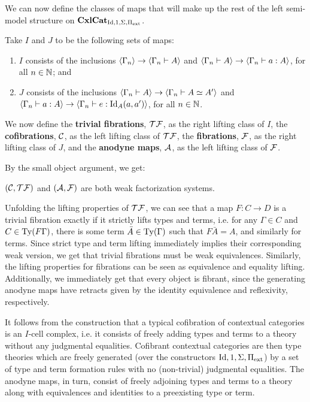 \documentclass{amsart}
\begin{document}
We can now define the classes of maps that will make up the rest of the left semi-model structure on $\operatorname{\mathbf{CxlCat}}_{\operatorname{Id},1,\Sigma,\Pi_{\operatorname{ext}}}$.
\begin{defn}
    Take $I$ and $J$ to be the following sets of maps:
    \begin{enumerate}
        \item $I$ consists of the inclusions $\langle\Gamma_n\rangle\to\langle\Gamma_n\vdash A\rangle$ and $\langle\Gamma_n\vdash A\rangle\to\langle\Gamma_n\vdash a:A\rangle$, for all $n\in\mathbb{N}$; and
        \item $J$ consists of the inclusions $\langle\Gamma_n\vdash A\rangle\to\langle\Gamma_n\vdash A\simeq A'\rangle$ and $\langle\Gamma_n\vdash a:A\rangle\to\langle\Gamma_n\vdash e:\operatorname{Id}_A(a,a')\rangle$, for all $n\in\mathbb{N}$.
    \end{enumerate}
\end{defn}
\begin{defn}
    We now define the \textbf{trivial fibrations}, $\mathcal{T}\mathcal{F}$, as the right lifting class of $I$, the \textbf{cofibrations}, $\mathcal{C}$, as the left lifting class of $\mathcal{T}\mathcal{F}$, the \textbf{fibrations}, $\mathcal{F}$, as the right lifting class of $J$, and the \textbf{anodyne maps}, $\mathcal{A}$, as the left lifting class of $\mathcal{F}$.
\end{defn}

By the small object argument, we get:
\begin{prop}
    $(\mathcal{C},\mathcal{T}\mathcal{F})$ and $(\mathcal{A},\mathcal{F})$ are both weak factorization systems.
\end{prop}

Unfolding the lifting properties of $\mathcal{T}\mathcal{F}$, we can see that a map $F\colon C\to D$ is a trivial fibration exactly if it strictly lifts types and terms, i.e. for any $\Gamma\in C$ and $C\in\operatorname{Ty}(F\Gamma)$, there is some term $\bar{A}\in\operatorname{Ty}(\Gamma)$ such that $F\bar{A}=A$, and similarly for terms. Since strict type and term lifting immediately implies their corresponding weak version, we get that trivial fibrations must be weak equivalences. Similarly, the lifting properties for fibrations can be seen as equivalence and equality lifting. Additionally, we immediately get that every object is fibrant, since the generating anodyne maps have retracts given by the identity equivalence and reflexivity, respectively.

It follows from the construction that a typical cofibration of contextual categories is an $I$-cell complex, i.e. it consists of freely adding types and terms to a theory without any judgmental equalities. Cofibrant contextual categories are then type theories which are freely generated (over the constructors $\operatorname{Id},1,\Sigma,\Pi_{\operatorname{ext}}$) by a set of type and term formation rules with no (non-trivial) judgmental equalities. The anodyne maps, in turn, consist of freely adjoining types and terms to a theory along with equivalences and identities to a preexisting type or term.
\end{document}
